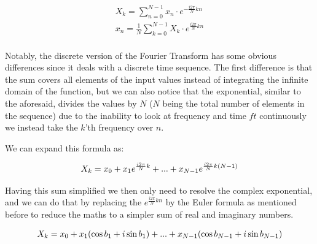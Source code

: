 \documentclass[
  oneside,
  11pt, a4paper,
  footinclude=true,
  headinclude=true,
  cleardoublepage=empty
]{scrbook}
\newcommand{\eqname}[1]{\tag*{#1}}%
\begin{document}
\begin{equation} \label{eq:discrete-fourier-transform}
    \begin{split}
        X_{k} = \sum_{n=0}^{N-1}x_{n} \cdot e^{- \frac{i 2 \pi}{N}kn} \\ %
        x_{n} = \frac{1}{N} \sum_{k=0}^{N-1}X_{k} \cdot e^{\frac{i 2 \pi}{N}kn} \\ %
    \end{split}
\end{equation}

Notably, the discrete version of the Fourier Transform has some obvious differences since it deals with a discrete time sequence. The first difference is that the sum covers all elements of the input values instead of integrating the infinite domain of the function, but we can also notice that the exponential, similar to the aforesaid, divides the values by \(N\) (\(N\) being the total number of elements in the sequence) due to the inability to look at frequency and time \(ft\) continuously we instead take the \(k\)'th frequency over \(n\).

We can expand this formula as:

\begin{equation*}
    X_{k} = x_{0} + x_{1}e^{\frac{i 2 \pi}{N}k} + ... + x_{N-1}e^{\frac{i 2 \pi}{N}k(N-1)} \\
\end{equation*}

Having this sum simplified we then only need to resolve the complex exponential, and we can do that by replacing the \(e^{\frac{i 2 \pi}{N}kn}\) by the Euler formula as mentioned before to reduce the maths to a simpler sum of real and imaginary numbers.

\begin{equation} \label{dft_reduction}
    X_{k} = x_{0} + x_{1} (\cos{b_{1}} + i\sin{b_{1}}) + ... + x_{N-1} (\cos{b_{N-1}} + i\sin{b_{N-1}}) \\
\end{equation}
\end{document}
